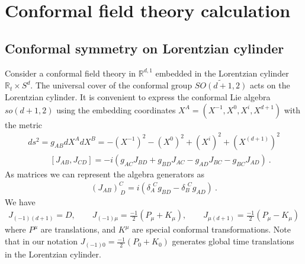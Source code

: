 \documentclass[a4paper,11pt]{article}
\theoremstyle{definition}
\newcommand{\nn}{\nonumber}
\newcommand{\lb}{\left(}
\newcommand{\rb}{\right)}
\newcommand{\mO}{\mathcal{O}}
\newcommand{\p}{\partial}
\begin{document}


\section{Conformal field theory calculation}\label{app:CFT}
\subsection{Conformal symmetry on Lorentzian cylinder}
Consider a conformal field theory in $\mathbb{R}^{d,1}$ embedded in the Lorentzian cylinder $\mathbb{R}_t\times S^d$. The universal cover of the conformal group $\widetilde{SO(d+1,2)}$ acts on the Lorentzian cylinder. It is convenient to express the conformal Lie algebra $so(d+1,2)$ using the embedding coordinates $X^A=(X^{-1},X^0,X^i,X^{d+1})$ with the metric 
\begin{eqnarray}
    ds^2=g_{AB}dX^AdX^B=-(X^{-1})^2-(X^{0})^2+(X^i)^2+(X^{(d+1)})^2
\end{eqnarray}
\begin{eqnarray}
    &&[J_{AB},J_{CD}]=-i\lb g_{AC}J_{BD}+g_{BD}J_{AC}-g_{AD}J_{BC}-g_{BC}J_{AD}\rb\ .
\end{eqnarray}
As matrices we can represent the algebra generators as
\begin{eqnarray}
    (J_{AB})^C_{\: D}=i(\delta_A^{\:\: C}g_{BD}-\delta_B^{\:\: C}g_{AD})\ .
\end{eqnarray}
We have
\begin{eqnarray}
    J_{(-1)(d+1)}=D,\qquad J_{(-1)\mu}=\frac{-1}{2}(P_\mu+K_\mu),\qquad J_{\mu(d+1)}=\frac{-1}{2}\lb P_\mu-K_\mu\rb
\end{eqnarray}
where $P^\mu$ are translations, and $K^\mu$ are special conformal transformations. Note that in our notation $J_{(-1)0}=\frac{-1}{2}(P_0+K_0)$ generates global time translations in the Lorentzian cylinder.
\end{document}
